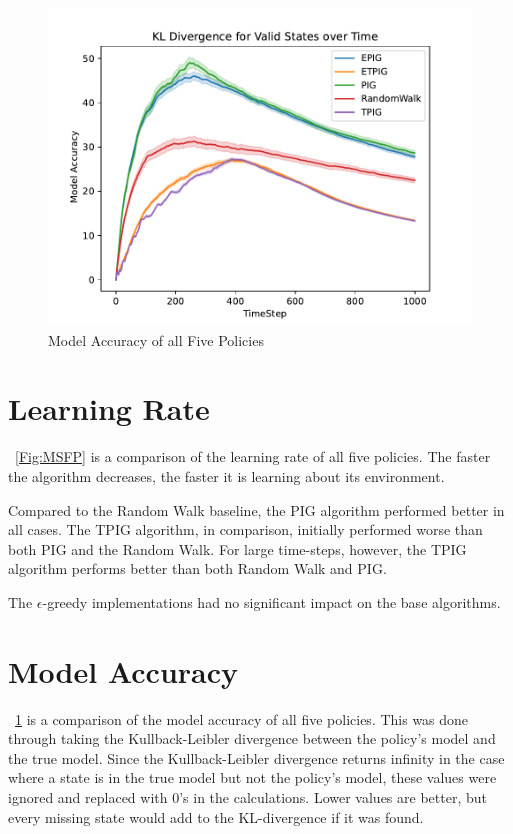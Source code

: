 \documentclass[12pt]{thesis}
\begin{document}
\begin{figure}
	\begin{center}
	\includegraphics[scale=0.75]{"images/Model_Accuracy.pdf"}
	\end{center}
	\caption{Model Accuracy of all Five Policies}
	\label{Fig:MAFP}
\end{figure}
\section{Learning Rate}
\figurename~\ref{Fig:MSFP} is a comparison of the learning rate of all five policies. The faster the algorithm decreases, the faster it is learning about its environment.

Compared to the Random Walk baseline, the PIG algorithm performed better in all cases. The TPIG algorithm, in comparison, initially performed worse than both PIG and the Random Walk. For large time-steps, however, the TPIG algorithm performs better than both Random Walk and PIG.

The $\epsilon$-greedy implementations had no significant impact on the base algorithms.


\section{Model Accuracy}
\figurename~\ref{Fig:MAFP} is a comparison of the model accuracy of all five policies. This was done through taking the Kullback-Leibler divergence between the policy's model and the true model. Since the Kullback-Leibler divergence returns infinity in the case where a state is in the true model but not the policy's model, these values were ignored and replaced with 0's in the calculations. Lower values are better, but every missing state would add to the KL-divergence if it was found.
\end{document}
